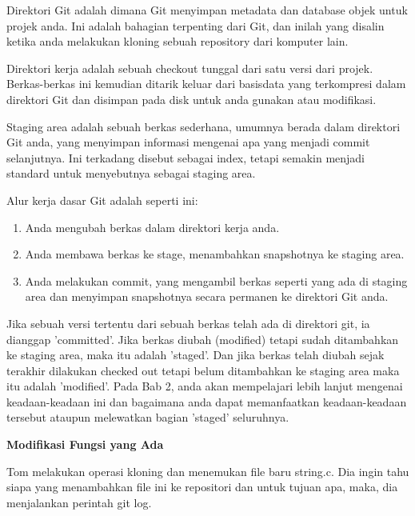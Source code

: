 Direktori Git adalah dimana Git menyimpan metadata dan database objek 
untuk projek anda. Ini adalah bahagian terpenting dari Git, dan inilah 
yang disalin ketika anda melakukan kloning sebuah repository dari 
komputer lain.\vspace{12pt}

Direktori kerja adalah sebuah checkout tunggal dari satu versi dari 
projek. Berkas-berkas ini kemudian ditarik keluar dari basisdata yang 
terkompresi dalam direktori Git dan disimpan pada disk untuk anda 
gunakan atau modifikasi.\vspace{12pt}

Staging area adalah sebuah berkas sederhana, umumnya berada dalam 
direktori Git anda, yang menyimpan informasi mengenai apa yang menjadi 
commit selanjutnya. Ini terkadang disebut sebagai index, tetapi semakin 
menjadi standard untuk menyebutnya sebagai staging area.\vspace{12pt}

Alur kerja dasar Git adalah seperti ini:

\begin{enumerate}
\item Anda mengubah berkas dalam direktori kerja anda.
\item Anda membawa berkas ke stage, menambahkan snapshotnya ke staging 
area.
\item Anda melakukan commit, yang mengambil berkas seperti yang ada di 
staging area dan menyimpan snapshotnya secara permanen ke direktori Git 
anda.
\setcounter{numberedCntF}{\theenumi}
\end{enumerate}
Jika sebuah versi tertentu dari sebuah berkas telah ada di direktori 
git, ia dianggap 'committed'. Jika berkas diubah (modified) tetapi sudah 
ditambahkan ke staging area, maka itu adalah 'staged'. Dan jika berkas 
telah diubah sejak terakhir dilakukan checked out tetapi belum 
ditambahkan ke staging area maka itu adalah 'modified'. Pada Bab 2, anda 
akan mempelajari lebih lanjut mengenai keadaan-keadaan ini dan bagaimana 
anda dapat memanfaatkan keadaan-keadaan tersebut ataupun melewatkan 
bagian 'staged' seluruhnya.\vspace{12pt}

\textbf{Modifikasi Fungsi yang Ada}\vspace{12pt}

Tom melakukan operasi kloning dan menemukan file baru string.c. Dia 
ingin tahu siapa yang menambahkan file ini ke repositori dan untuk 
tujuan apa, maka, dia menjalankan perintah git log.\vspace{12pt}

